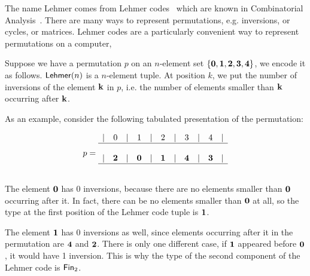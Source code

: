 
The name Lehmer comes from Lehmer
codes~\cite{lehmerTeachingCombinatorialTricks1960} which are known in
Combinatorial Analysis~\cite{bellmanCombinatorialAnalysis1960}. There are many
ways to represent permutations, e.g. inversions, or cycles, or matrices. Lehmer
codes are a particularly convenient way to represent permutations on a
computer,~


Suppose we have a permutation $p$ on an $n$-element set
$\{\mathbf{0}, \mathbf{1}, \mathbf{2}, \mathbf{3}, \mathbf{4}\}$, we encode it as follows.
$\Lehmer[n]$ is a $n$-element tuple. At position $k$, we put the number of
inversions of the element $\mathbf{k}$ in $p$, i.e. the number of elements smaller
than $\mathbf{k}$ occurring after $\mathbf{k}$.

As an example, consider the following tabulated presentation of the permutation:


\[
  p =
  \begin{array}{ccccccccccccccc}
    | & 0      & | & 1      & | & 2      & | & 3      & | & 4      & | \\
    \hline                                                             \\
    | & \mathbf{2} & | & \mathbf{0} & | & \mathbf{1} & | & \mathbf{4} & | & \mathbf{3} & | \\
    \hline                                                             \\
  \end{array}
\]


The element $\mathbf{0}$ has 0 inversions, because there are no elements smaller
than $\mathbf{0}$ occurring after it. In fact, there can be no elements smaller than
$\mathbf{0}$ at all, so the type at the first position of the Lehmer code tuple is
${\mathbf{1}}$.

The element $\mathbf{1}$ has 0 inversions as well, since elements occurring after it
in the permutation are $\mathbf{4}$ and $\mathbf{2}$. There is only one different case,
if $\mathbf{1}$ appeared before $\mathbf{0}$, it would have 1 inversion. This is why the
type of the second component of the Lehmer code is $\Fin[2]$.

